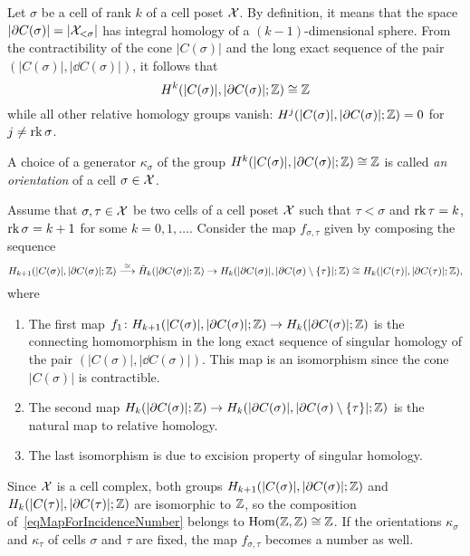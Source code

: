 Let $\sigma$ be a cell of rank $k$ of a cell poset $\mathcal{X}$. By definition, it means that the space $|\partial C(\sigma)|=|\mathcal{X}_{<\sigma}|$ has integral homology of a $(k-1)$-dimensional sphere. From the contractibility of the cone $|C(\sigma)|$ and the long exact sequence of the pair $(|C(\sigma)|,|\dd C(\sigma)|)$, it follows that
\[
H^k(|C(\sigma)|,|\partial C(\sigma)|;\mathbb{Z})\cong \mathbb{Z}
\]
while all other relative homology groups vanish: $H^j(|C(\sigma)|,|\partial C(\sigma)|;\mathbb{Z})=0$ for $j\neq \operatorname{rk}\sigma$.

\begin{defin}\label{definCellOrientation}
A choice of a generator $\kappa_\sigma$ of the group $H^k(|C(\sigma)|,|\partial C(\sigma)|;\mathbb{Z})\cong \mathbb{Z}$ is called \emph{an orientation} of a cell $\sigma\in\mathcal{X}$.
\end{defin}

\begin{con}\label{conIncidenceNumbers}
Assume that $\sigma,\tau\in \mathcal{X}$ be two cells of a cell poset $\mathcal{X}$ such that $\tau<\sigma$ and $\operatorname{rk}\tau=k$, $\operatorname{rk}\sigma=k+1$ for some $k=0,1,\ldots$. Consider the map $f_{\sigma,\tau}$ given by composing the sequence
\begin{equation}\label{eqMapForIncidenceNumber}
H_{k+1}(|C(\sigma)|,|\partial C(\sigma)|;\mathbb{Z})\stackrel{\cong}{\longrightarrow} \tilde{H}_{k}(|\partial C(\sigma)|;\mathbb{Z})\to H_{k}(|\partial C(\sigma)|,|\partial C(\sigma)\setminus\{\tau\}|;\mathbb{Z})\cong H_{k}(|C(\tau)|,|\partial C(\tau)|;\mathbb{Z}),
\end{equation}
where
\begin{enumerate}
  \item The first map $f_1\colon H_{k+1}(|C(\sigma)|,|\partial C(\sigma)|;\mathbb{Z})\to H_{k}(|\partial C(\sigma)|;\mathbb{Z})$ is the connecting homomorphism in the long exact sequence of singular homology of the pair $(|C(\sigma)|,|\dd C(\sigma)|)$. This map is an isomorphism since the cone $|C(\sigma)|$ is contractible.
  \item The second map $H_{k}(|\partial C(\sigma)|;\mathbb{Z})\to H_{k}(|\partial C(\sigma)|,|\partial C(\sigma)\setminus\{\tau\}|;\mathbb{Z})$ is the natural map to relative homology.
  \item The last isomorphism is due to excision property of singular homology.
\end{enumerate}
Since $\mathcal{X}$ is a cell complex, both groups $H_{k+1}(|C(\sigma)|,|\partial C(\sigma)|;\mathbb{Z})$ and $H_{k}(|C(\tau)|,|\partial C(\tau)|;\mathbb{Z})$ are isomorphic to $\mathbb{Z}$, so the composition of~\eqref{eqMapForIncidenceNumber} belongs to $\operatorname{Hom}(\mathbb{Z},\mathbb{Z})\cong\mathbb{Z}$. If the orientations $\kappa_\sigma$ and $\kappa_\tau$ of cells $\sigma$ and $\tau$ are fixed, the map $f_{\sigma,\tau}$ becomes a number as well.
\end{con}

